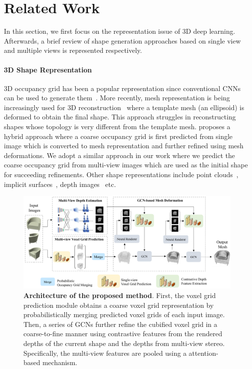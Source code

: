 \section{Related Work}
In this section, we first focus on the representation issue of 3D deep learning. Afterwards, a brief review of shape generation approaches based on single view and multiple views is represented respectively.

\paragraph{3D Shape Representation}\vspace{-4mm}
3D occupancy grid has been a popular representation since conventional CNNs can be used to generate them~\cite{3dr2n2,kar2017lsm}.
More recently, mesh representation is being increasingly used for 3D reconstruction~\cite{wang2018pixel2mesh,wen2019pixel2mesh++} where a template mesh (an ellipsoid) is deformed to obtain the final shape.
This approach struggles in reconstructing shapes whose topology is very different from the template mesh.
\cite{gkioxari2019meshrcnn} proposes a hybrid approach where a coarse occupancy grid is first predicted from single image which is converted to mesh representation and further refined using mesh deformations.
We adopt a similar approach in our work where we predict the coarse occupancy grid from multi-view images which are used as the initial shape for succeeding refinements.
Other shape representations include point clouds~\cite{fan2017point,yang2018foldingnet,jia2020dv}, implicit surfaces~\cite{park2019deepsdf}, depth images~\cite{yao2018mvsnet,yao2019recurrent} etc.

\begin{figure}[t]
\begin{center}
\includegraphics[width=0.95\linewidth]{imgs/arc.png}
\end{center}
\caption{
    \textbf{Architecture of the proposed method}.
    First, the voxel grid prediction module obtains a coarse voxel grid representation by probabilistically merging predicted voxel grids of each input image.
    Then, a series of GCNs further refine the cubified voxel grid in a coarse-to-fine manner using contrastive features from the rendered depths of the current shape and the depths from multi-view stereo.
    Specifically, the multi-view features are pooled using a attention-based mechanism.
}
\label{fig:system_architecture}
\end{figure}

